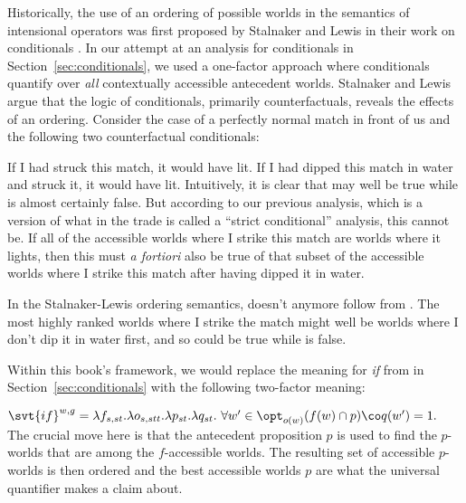 %
Historically, the use of an ordering of possible worlds in the semantics of
intensional operators was first proposed by Stalnaker and Lewis in their work
on conditionals \parencite{stalnaker-1968-TheoryConditionals,lewis-1973-counterfactuals}. In
our attempt at an analysis for conditionals in Section~\ref{sec:conditionals},
we used a one-factor approach where conditionals quantify over \emph{all}
contextually accessible antecedent worlds. Stalnaker and Lewis argue that the
logic of conditionals, primarily counterfactuals, reveals the effects of an
ordering. %
%
Consider the case of a perfectly normal match in front of us and the following
two counterfactual conditionals:

\pex
\a If I had struck this match, it would have lit.
\a If I had dipped this match in water and struck it, it would have lit.
\xe
%
Intuitively, it is clear that \Last[a] may well be true while \Last[b] is almost
certainly false. But according to our previous analysis, which is a version of
what in the trade is called a ``strict conditional'' analysis, this cannot be.
If all of the accessible worlds where I strike this match are worlds where it
lights, then this must \emph{a fortiori} also be true of that subset of the
accessible worlds where I strike this match after having dipped it in water.

In the Stalnaker-Lewis ordering semantics, \Last[b] doesn't anymore follow from
\Last[a]. The most highly ranked worlds where I strike the match might well be
worlds where I don't dip it in water first, and so \Last[a] could be true while
\Last[b] is false.

Within this book's framework, we would replace the meaning for \emph{if} from
 in Section~\ref{sec:conditionals} with the
following two-factor meaning:

\ex
$\svt{if}^{w,g} = \lambda f_{s,st}.\lambda o_{s,stt}.\lambda p_{st}.\lambda
q_{st}.\ \forall w'\in \opt_{o(w)}(f(w) \cap p)\co q(w')=1.$
\xe
%
The crucial move here is that the antecedent proposition $p$ is used to find the
$p$-worlds that are among the $f$-accessible worlds. The resulting set of
accessible $p$-worlds is then ordered and the best accessible worlds $p$ are
what the universal quantifier makes a claim about.

